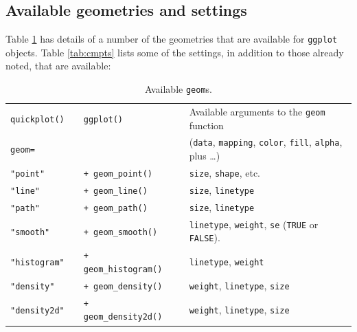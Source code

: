 \documentclass{tufte-book}\usepackage[]{graphicx}\usepackage[]{color}
\newcommand{\txtt}[1]{\texttt{#1}}
\begin{document}
\subsection*{Available geometries and settings}

Table \ref{tab:geom} has details of a number of the geometries that
are available for \txtt{ggplot} objects. Table \ref{tab:cmpts} lists
some of the settings, in addition to those already noted, that are
available:\\[-9pt]
\begin{fullwidth}
\begin{table}
\caption{Available \texttt{geom}s.\label{tab:geom}}
\begin{center}
\vspace*{18pt}

\begin{minipage}[t]{0.975\textwidth}
\setcounter{mpfootnote}{\value{footnote}}
\renewcommand{\thempfootnote}{\arabic{mpfootnote}}
\hspace*{6pt} \begin{tabular}{lllll}
  \texttt{quickplot()} && \texttt{ggplot()} && Available arguments to
  the \texttt{geom} function\\
\cline{1-1} \cline{3-3} \cline{5-5}
\texttt{geom=} &&  && (\texttt{data}, \texttt{mapping},
\texttt{color}, \texttt{fill}, \texttt{alpha}, plus \ldots)\\
\cline{1-1} \cline{3-3} \cline{5-5}
  \texttt{"point"} &&\verb!+ geom_point()! && \texttt{size},
  \texttt{shape}, etc.\\
  \texttt{"line"} &&\verb!+ geom_line()! &&
  \texttt{size}, \texttt{linetype}
  \\
  \texttt{"path"} &&\verb!+ geom_path()!\footnotemark[1] &&
  \texttt{size}, \texttt{linetype}
  \\
  \texttt{"smooth"} &&\verb!+ geom_smooth()! &&
  \texttt{linetype},
  \texttt{weight}, \texttt{se} (\texttt{TRUE} or \texttt{FALSE}).
  \\
  \texttt{"histogram"} &&\verb!+ geom_histogram()! &&
  \texttt{linetype}, \texttt{weight}
  \\
  \texttt{"density"} &&\verb!+ geom_density()! &&
\texttt{weight},  \texttt{linetype}, \texttt{size}
\\
  \texttt{"density2d"} &&\verb!+ geom_density2d()! &&
\texttt{weight},  \texttt{linetype}, \texttt{size}\\
\end{tabular}
\setcounter{footnote}{\value{mpfootnote}}
\end{minipage}
\end{center}
\end{table}
\end{fullwidth}
\end{document}
